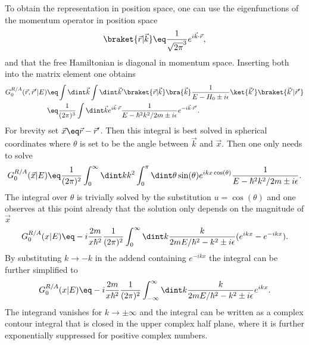 \documentclass[\main/dresen_thesis.tex]{subfiles}
\begin{document}
    To obtain the representation in position space, one can use the eigenfunctions of the momentum operator in position space
    \begin{align}
      \braket{\vec{r}|\vec{k}} \eq \frac{1}{\sqrt{2 \pi}^3} e^{i \vec{k} \cdot \vec{r}},
    \end{align}
    and that the free Hamiltonian is diagonal in momentum space.
    Inserting both into the matrix element one obtains
    \begin{align}
      \begin{split}
        G_0^{R/A}(\vec{r}, \vec{r}^\prime | E) \eq & \int \dint \vec{k} \int \dint \vec{k}^\prime \braket{\vec{r} | \vec{k}} \bra{\vec{k}} \frac{1}{E - H_0 \pm i \epsilon} \ket{\vec{k}^\prime} \braket{\vec{k}^\prime | \vec{r}^\prime}\\
        \eq & \frac{1}{(2\pi)^3} \int \dint \vec{k} e^{i \vec{k} \cdot \vec{r}} \frac{1}{E - \hbar^2 k^2 / 2m \pm i \epsilon} e^{-i \vec{k} \cdot \vec{r}^\prime}.
      \end{split}
    \end{align}
    For brevity set $\vec{x} \eq \vec{r} - \vec{r}^\prime$.
    Then this integral is best solved in spherical coordinates where $\theta$ is set to be the angle between $\vec{k}$ and $\vec{x}$.
    Then one only needs to solve
    \begin{align}
      G_0^{R/A}(\vec{x} | E) \eq \frac{1}{(2\pi)^2} \int_0^\infty \dint k k^2 \int_0^{\pi} \dint \theta \sin(\theta) e^{i k x \cos(\theta)} \frac{1}{E - \hbar^2 k^2 / 2m \pm i \epsilon}.
    \end{align}
    The integral over $\theta$ is trivially solved by the substitution $u = \cos(\theta)$ and one observes at this point already that the solution only depends on the magnitude of $\vec{x}$
    \begin{align}
      G_0^{R/A}(x | E) \eq -i \frac{2m}{x\hbar^2} \frac{1}{(2\pi)^2} \int_0^\infty \dint k \frac{k}{2mE/\hbar^2 -  k^2 \pm i \epsilon} (e^{i k x} - e^{-i k x}).
    \end{align}
    By substituting $k \rightarrow -k$ in the addend containing $e^{-ikx}$ the integral can be further simplified to
    \begin{align}
      G_0^{R/A}(x | E) \eq -i \frac{2m}{x\hbar^2} \frac{1}{(2\pi)^2} \int_{-\infty}^\infty \dint k \frac{k}{2mE/\hbar^2 -  k^2 \pm i \epsilon} e^{i k x}.
    \end{align}
    The integrand vanishes for $k \rightarrow \pm \infty$ and the integral can be written as a complex contour integral that is closed in the upper complex half plane, where it is further exponentially suppressed for positive complex numbers.
\end{document}
